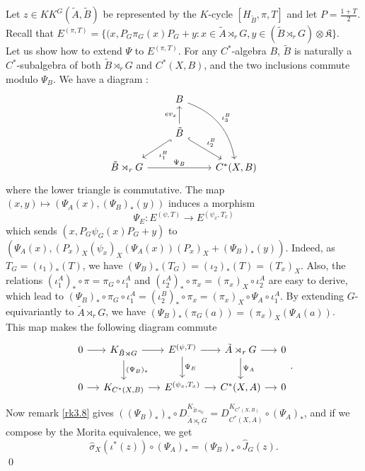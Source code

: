 \begin{dem}
Let $z\in KK^G(\tilde A,\tilde B)$ be represented by the $K$-cycle $[H_{\tilde B},\pi,T]$ and let $P=\frac{1+T}{2}$. %
Recall that $E^{(\pi,T)} = \{(x,P_G\pi_G(x)P_G+y : x\in \tilde A\rtimes_r G,y\in (\tilde B\rtimes_r G)\otimes\mathfrak K\}$.\\

Let us show how to extend $\Psi$ to $E^{(\pi,T)}$. For any $C^*$-algebra $B$, $\tilde B$ is naturally a $C^*$-subalgebra of both $\tilde B\rtimes_r G$ and $C^*(X,B)$, and the two inclusions commute modulo $\Psi_B$. We have a diagram :
\[\begin{tikzcd} 
  \  & B \arrow[bend left]{rdd}{\iota_3^B}& \\
  \ &\tilde B \arrow{u}{ev_x}\arrow[hookrightarrow]{ld}{\iota_1^B}\arrow[hookrightarrow]{rd}{\iota_2^B} &  \\ 
\tilde B\rtimes_rG \arrow{rr}{\Psi_B} &  &  C^*(X,B) 
\end{tikzcd}\] 
where the lower triangle is commutative. The map $(x,y)\mapsto (\Psi_A(x), (\Psi_B)_*(y))$ induces a morphism 
\[\Psi_E : E^{(\psi,T)}  \rightarrow  E^{(\psi_x,T_x)} \] 
which sends $(x,P_G \psi_G(x)P_G + y)$ to $(\Psi_A(x), (P_x)_X(\psi_x)_X(\Psi_A(x))(P_x)_X+(\Psi_B)_*(y))$. Indeed, as $T_G = (\iota_1)_*(T)$, we have $(\Psi_B)_*(T_G)=(\iota_2)_*(T)=(T_x)_X$. Also, the relations $(\iota_1^A)_*\circ\pi = \pi_G\circ \iota_1^A$ and $(\iota_2^A)_*\circ\pi_x = (\pi_x)_X\circ \iota_2^A$ are easy to derive, which lead to $(\Psi_B)_*\circ \pi_G \circ \iota_1^A= (\iota_2^B)_*\circ \pi_x = (\pi_x)_X\circ \Psi_A\circ \iota_1^A$. By extending $G$-equivariantly to $\tilde A  \rtimes_r G$, we have $(\Psi_B)_*(\pi_G(a))=(\pi_x)_X(\Psi_A(a))$.\\

This map makes the following diagram commute
\[
\begin{tikzcd}[column sep = small]
0\arrow{r} & K_{\tilde B\rtimes G}\arrow{r}\arrow{d}{(\Psi_B)_*} & E^{(\psi,T)} \arrow{r}\arrow{d}{\Psi_E}& \tilde A\rtimes_r G\arrow{r}\arrow{d}{\Psi_A} & 0\\
0\arrow{r} & K_{C^*(X,B)}\arrow{r} & E^{(\psi_x,T_x)} \arrow{r}& C^*(X,A)\arrow{r} & 0
\end{tikzcd}.
\]
Now remark \ref{rk3.8} gives $((\Psi_B)_*)_*\circ D_{\tilde A\rtimes_rG}^{K_{\tilde B\rtimes_G}} = D_{C^*(X,A)}^{K_{C^*(X,B)}}\circ (\Psi_A)_*$, and if we compose by the Morita equivalence, we get 
\[\hat\sigma_X(\iota^*(z)) \circ (\Psi_A)_* = (\Psi_B)_*\circ \hat J_G(z).\]
\qed
\end{dem}

